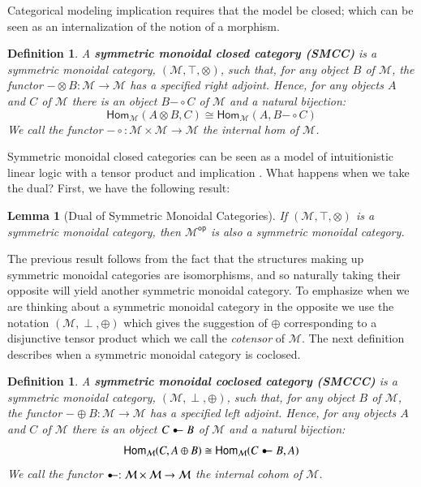 \documentclass{lmcs}
\newtheorem{lemma}[theorem]{Lemma}
\newtheorem{definition}[theorem]{Definition}
\let\mto\to
\let\to\relax
\newcommand{\to}{\rightarrow}
\newcommand{\cat}[1]{\mathcal{#1}}
\newcommand{\catop}[1]{\cat{#1}^{\mathsf{op}}}
\newcommand{\Hom}[3]{\mathsf{Hom}_{\cat{#1}}(#2,#3)}
\newcommand{\limp}[0]{\multimap}
\newcommand{\colimp}[0]{\multimapdotinv}
\def\limp{\mathrel{-\!\circ}}
\begin{document}
Categorical modeling implication requires that the model be closed;
which can be seen as an internalization of the notion of a morphism.
\begin{definition}
  \label{def:SMCC}
  A \textbf{symmetric monoidal closed category (SMCC)} is a symmetric
  monoidal category, $(\cat{M},\top,\otimes)$, such that, for any object
  $B$ of $\cat{M}$, the functor $- \otimes B : \cat{M} \mto \cat{M}$
  has a specified right adjoint.  Hence, for any objects $A$ and $C$
  of $\cat{M}$ there is an object $B \limp C$ of $\cat{M}$ and a
  natural bijection:
  \[
  \Hom{\cat{M}}{A \otimes B}{C} \cong \Hom{\cat{M}}{A}{B \limp C}
  \]
  We call the functor $\limp : \cat{M} \times \cat{M} \mto \cat{M}$
  the internal hom of $\cat{M}$.
\end{definition}

Symmetric monoidal closed categories can be seen as a model of
intuitionistic linear logic with a tensor product and implication
\cite{Bierman:1994}.  What happens when we take the dual?  First, we
have the following result:
\begin{lemma}[Dual of Symmetric Monoidal Categories]
  \label{lemma:dual_of_symmetric_monoidal_categories}
  If $(\cat{M},\top,\otimes)$ is a symmetric monoidal category, then
  $\catop{M}$ is also a symmetric monoidal category.
\end{lemma}
The previous result follows from the fact that the structures making
up symmetric monoidal categories are isomorphisms, and so naturally
taking their opposite will yield another symmetric monoidal category.
To emphasize when we are thinking about a symmetric monoidal category
in the opposite we use the notation $(\cat{M},\perp,\oplus)$ which gives
the suggestion of $\oplus$ corresponding to a disjunctive tensor
product which we call the \textit{cotensor} of $\cat{M}$. The next
definition describes when a symmetric monoidal category is coclosed.
\begin{definition}
  \label{def:SMCCC}
  A \textbf{symmetric monoidal coclosed category (SMCCC)} is a symmetric
  monoidal category, $(\cat{M},\perp,\oplus)$, such that, for any object
  $B$ of $\cat{M}$, the functor $- \oplus B : \cat{M} \mto \cat{M}$
  has a specified left adjoint.  Hence, for any objects $A$ and $C$
  of $\cat{M}$ there is an object $C \colimp B$ of $\cat{M}$ and a
  natural bijection:
  \[
  \Hom{\cat{M}}{C}{A \oplus B} \cong \Hom{\cat{M}}{C \colimp B}{A}
  \]
  We call the functor $\colimp : \cat{M} \times \cat{M} \mto \cat{M}$
  the internal cohom of $\cat{M}$.
\end{definition}
\end{document}
